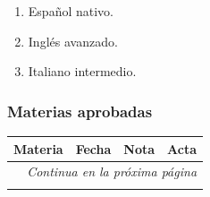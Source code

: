 \documentclass[a4paper,11pt]{article}
\begin{document}
\begin{enumerate}

  \item Español nativo.

  \item Inglés avanzado.

  \item Italiano intermedio.

\end{enumerate}

\subsubsection{Materias aprobadas}

\begin{longtable}{|l|l|r|l|}
  \hline
  Materia                                       & Fecha      & Nota & Acta              \\
  \hline
  \endhead

  \hline
  \multicolumn{4}{r}{\textit{Continua en la próxima página}} \\
  \endfoot

  \hline
  \endlastfoot



\end{longtable}
\end{document}
